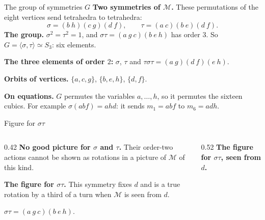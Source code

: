 \begin{frame}{The group of symmetries \(G\)}
\textbf{Two symmetries of \(\mathcal M\).} These permutations of the eight vertices send tetrahedra to tetrahedra:
\[
\sigma=(b\ h)(c\ g)(d\ f),\qquad\tau=(a\ c)(b\ e)(d\ f).
\]
\textbf{The group.} \(\sigma^2=\tau^2=1\), and \(\sigma\tau=(a\ g\ c)(b\ e\ h)\) has order \(3\). So \(G=\langle\sigma,\tau\rangle\simeq S_3\): six elements.
\par
\textbf{The three elements of order \(2\):} \(\sigma\), \(\tau\) and \(\tau\sigma\tau=(a\ g)(d\ f)(e\ h)\).
\par
\textbf{Orbits of vertices.} \(\{a,c,g\}\), \(\{b,e,h\}\), \(\{d,f\}\).
\par
\textbf{On equations.} \(G\) permutes the variables \(a,\dots,h\), so it permutes the sixteen cubics. For example \(\sigma(abf)=ahd\): it sends \(m_1=abf\) to \(m_6=adh\).
\par
\end{frame}

\begin{frame}{Figure for \(\sigma\tau\)}
\begin{columns}[t]
\begin{column}{0.42\textwidth}
\textbf{No good picture for \(\sigma\) and \(\tau\).} Their order-two actions cannot be shown as rotations in a picture of \(\mathcal M\) of this kind.
\par\medskip
\textbf{The figure for \(\sigma\tau\).} This symmetry fixes \(d\) and is a true rotation by a third of a turn when \(\mathcal M\) is seen from \(d\).
\par\medskip
\(\sigma\tau=(a\ g\ c)(b\ e\ h)\).
\end{column}
\begin{column}{0.52\textwidth}
\centering
\textbf{The figure for \(\sigma\tau\), seen from \(d\).}
\end{column}
\end{columns}
\end{frame}

